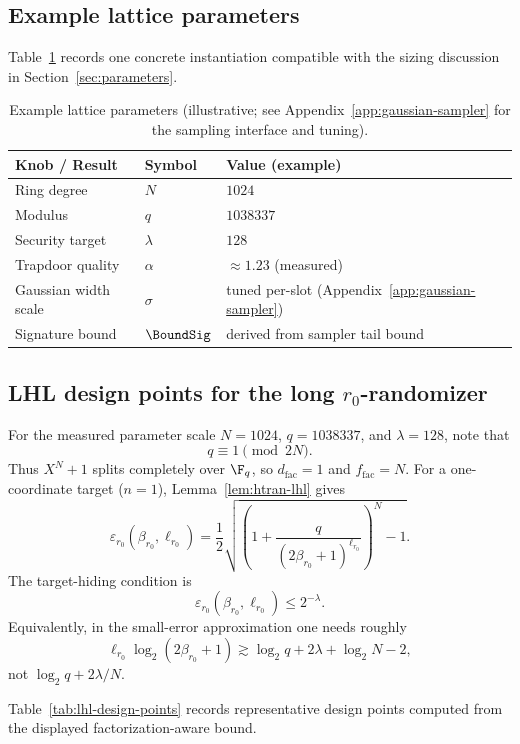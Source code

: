 \subsection{Example lattice parameters}
Table~\ref{tab:lattice-params} records one concrete instantiation compatible with the sizing discussion in
Section~\ref{sec:parameters}.

\begin{table}[H]
\centering
\renewcommand{\arraystretch}{1.15}
\begin{tabular}{@{}lll@{}}
\toprule
\textbf{Knob / Result} & \textbf{Symbol} & \textbf{Value (example)} \\
\midrule
Ring degree & \(N\) & \(1024\) \\
Modulus & \(q\) & \(1038337\) \\
Security target & \(\lambda\) & \(128\) \\
\midrule
Trapdoor quality & \(\alpha\) & \(\approx 1.23\) (measured) \\
Gaussian width scale & \(\sigma\) & tuned per-slot (Appendix~\ref{app:gaussian-sampler}) \\
Signature bound & \(\BoundSig\) & derived from sampler tail bound \\
\bottomrule
\end{tabular}
\caption{Example lattice parameters (illustrative; see Appendix~\ref{app:gaussian-sampler} for the sampling interface and
tuning).}
\label{tab:lattice-params}
\end{table}

\subsection{LHL design points for the long $r_0$-randomizer}
For the measured parameter scale \(N=1024\), \(q=1038337\), and \(\lambda=128\), note that
\[
  q\equiv 1 \pmod {2N}.
\]
Thus \(X^N+1\) splits completely over \(\F_q\), so \(d_{\mathrm{fac}}=1\) and
\(f_{\mathrm{fac}}=N\).  For a one-coordinate target (\(n=1\)), Lemma~\ref{lem:htran-lhl} gives
\[
  \varepsilon_{r_0}(\beta_{r_0},\ell_{r_0})
  =
  \frac12
  \sqrt{
    \left(
      1+\frac{q}{(2\beta_{r_0}+1)^{\ell_{r_0}}}
    \right)^N
    -1
  }.
\]
The target-hiding condition is
\[
  \varepsilon_{r_0}(\beta_{r_0},\ell_{r_0})\le 2^{-\lambda}.
\]
Equivalently, in the small-error approximation one needs roughly
\[
  \ell_{r_0}\log_2(2\beta_{r_0}+1)
  \gtrsim
  \log_2 q+2\lambda+\log_2 N-2,
\]
not \(\log_2 q+2\lambda/N\).

Table~\ref{tab:lhl-design-points} records representative design points computed from the displayed
factorization-aware bound.

